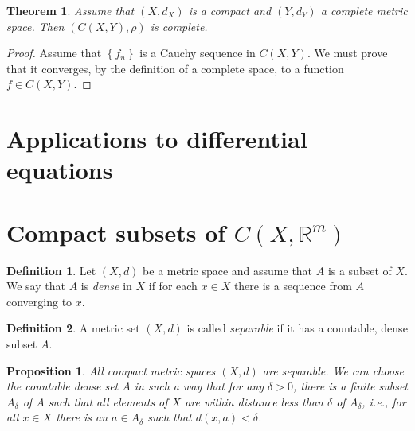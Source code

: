 \documentclass[a4paper]{report}
\newtheorem{prp}{Proposition}
\newtheorem{thrm}{Theorem}
\theoremstyle{definition}
\newtheorem{defn}{Definition}
\begin{document}
\begin{thrm}
  \label{thm_334}
  Assume that $\left( X, d_X \right)$ is a compact and $(Y, d_Y)$ a complete
  metric space. Then $\left( C(X, Y), \rho \right)$ is complete. 
\end{thrm}
\begin{proof}
  Assume that $\left\{ f_n \right\}$ is a Cauchy sequence in $C(X, Y)$. We must
  prove that it converges, by the definition of a complete space, to a function
  $f \in C(X, Y)$.
\end{proof}

\section{Applications to differential equations}
\section{Compact subsets of $C(X, \mathbb{R}^{m})$}
\begin{defn}
  \label{defn_351}
  Let $(X, d)$ be a metric space and assume that $A$ is a subset of $X$. We say
  that $A$ is \textit{dense} in $X$ if for each $x \in X$ there is a sequence from $A$
  converging to $x$.
\end{defn}
\begin{defn}
  \label{defn_352} 
  A metric set $(X, d)$ is called \textit{separable} if it has a countable,
  dense subset $A$.
\end{defn}

\begin{prp}
  \label{prp_353} 
  All compact metric spaces $(X, d)$ are separable. We can choose the countable
  dense set $A$ in such a way that for any $\delta > 0$, there is a finite
  subset $A_{\delta}$ of $A$ such that all elements of $X$ are within distance
  less than $\delta$ of $A_{\delta}$, i.e., for all $x \in X$ there is an $a
  \in A_{\delta}$ such that $d(x, a) < \delta$. 
\end{prp}
\end{document}
